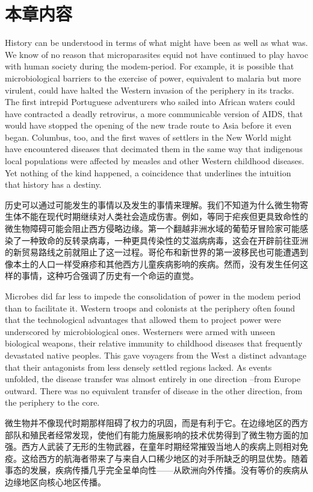 \chapter{本章内容}

\begin{paracol}{2}

History can be understood in terms of what might have been as well as what was. We know of no reason that microparasites equid not have continued to play havoc with human society during the modem-period. For example, it is possible that microbiological barriers to the exercise of power, equivalent to malaria but more virulent, could have halted the Western invasion of the periphery in its tracks. The first intrepid Portuguese adventurers who sailed into African waters could have contracted a deadly retrovirus, a more communicable version of AIDS, that would have stopped the opening of the new trade route to Asia before it even began. Columbus, too, and the first waves of settlers in the New World might have encountered diseases that decimated them in the same way that indigenous local populations were affected by measles and other Western childhood diseases. Yet nothing of the kind happened, a coincidence that underlines the intuition that history has a destiny.

\switchcolumn
历史可以通过可能发生的事情以及发生的事情来理解。我们不知道为什么微生物寄生体不能在现代时期继续对人类社会造成伤害。例如，等同于疟疾但更具致命性的微生物障碍可能会阻止西方侵略边缘。第一个翻越非洲水域的葡萄牙冒险家可能感染了一种致命的反转录病毒，一种更具传染性的艾滋病病毒，这会在开辟前往亚洲的新贸易路线之前就阻止了这一过程。哥伦布和新世界的第一波移民也可能遭遇到像本土的人口一样受麻疹和其他西方儿童疾病影响的疾病。然而，没有发生任何这样的事情，这种巧合强调了历史有一个命运的直觉。

\switchcolumn*
Microbes did far less to impede the consolidation of power in the modem period than to facilitate it. Western troops and colonists at the periphery often found that the technological advantages that allowed them to project power were underscored by microbiological ones. Westerners were armed with unseen biological weapons, their relative immunity to childhood diseases that frequently devastated native peoples. This gave voyagers from the West a distinct advantage that their antagonists from less densely settled regions lacked. As events unfolded, the disease transfer was almost entirely in one direction --from Europe outward. There was no equivalent transfer of disease in the other direction, from the periphery to the core. 

\switchcolumn
微生物并不像现代时期那样阻碍了权力的巩固，而是有利于它。在边缘地区的西方部队和殖民者经常发现，使他们有能力施展影响的技术优势得到了微生物方面的加强。西方人武装了无形的生物武器，在童年时期经常摧毁当地人的疾病上则相对免疫。这给西方的航海者带来了与来自人口稀少地区的对手所缺乏的明显优势。随着事态的发展，疾病传播几乎完全呈单向性——从欧洲向外传播。没有等价的疾病从边缘地区向核心地区传播。

\end{paracol}